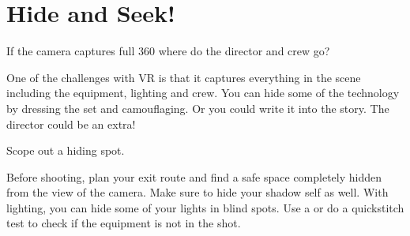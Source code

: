 \chapter{Hide and Seek!}
\pagecolor{white}
\label{chap:14}
\begin{fullwidth}

\problem

{\large If the camera captures full 360 where do the director and crew go? \par}

One of the challenges with VR is that it captures everything in the scene including the equipment, lighting and crew. You can hide some of the technology by dressing the set and camouflaging. Or you could write it into the story. The director could be an extra!



\solution

{\large Scope out a hiding spot. \par}

Before shooting, plan your exit route and find a safe space completely hidden from the view of the camera. Make sure to hide your shadow self as well. 
With lighting, you can hide some of your lights in blind spots. Use a \textbf{} or do a quickstitch test to check if the equipment is not in the shot. 





\clearpage
\end{fullwidth}
